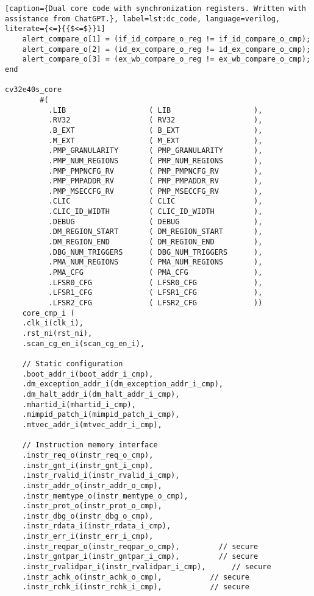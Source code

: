 \begin{lstlisting}[caption={Dual core code with synchronization registers. Written with assistance from ChatGPT.}, label=lst:dc_code, language=verilog, literate={<=}{{$<=$}}1]
    alert_compare_o[1] = (if_id_compare_o_reg != if_id_compare_o_cmp);
    alert_compare_o[2] = (id_ex_compare_o_reg != id_ex_compare_o_cmp);
    alert_compare_o[3] = (ex_wb_compare_o_reg != ex_wb_compare_o_cmp);
end

cv32e40s_core
        #(
          .LIB                   ( LIB                   ),
          .RV32                  ( RV32                  ),
          .B_EXT                 ( B_EXT                 ),
          .M_EXT                 ( M_EXT                 ),
          .PMP_GRANULARITY       ( PMP_GRANULARITY       ),
          .PMP_NUM_REGIONS       ( PMP_NUM_REGIONS       ),
          .PMP_PMPNCFG_RV        ( PMP_PMPNCFG_RV        ),
          .PMP_PMPADDR_RV        ( PMP_PMPADDR_RV        ),
          .PMP_MSECCFG_RV        ( PMP_MSECCFG_RV        ),
          .CLIC                  ( CLIC                  ),
          .CLIC_ID_WIDTH         ( CLIC_ID_WIDTH         ),
          .DEBUG                 ( DEBUG                 ),
          .DM_REGION_START       ( DM_REGION_START       ),
          .DM_REGION_END         ( DM_REGION_END         ),
          .DBG_NUM_TRIGGERS      ( DBG_NUM_TRIGGERS      ),
          .PMA_NUM_REGIONS       ( PMA_NUM_REGIONS       ),
          .PMA_CFG               ( PMA_CFG               ),
          .LFSR0_CFG             ( LFSR0_CFG             ),
          .LFSR1_CFG             ( LFSR1_CFG             ),
          .LFSR2_CFG             ( LFSR2_CFG             ))
    core_cmp_i (
    .clk_i(clk_i),
    .rst_ni(rst_ni),
    .scan_cg_en_i(scan_cg_en_i),

    // Static configuration
    .boot_addr_i(boot_addr_i_cmp),
    .dm_exception_addr_i(dm_exception_addr_i_cmp),
    .dm_halt_addr_i(dm_halt_addr_i_cmp),
    .mhartid_i(mhartid_i_cmp),
    .mimpid_patch_i(mimpid_patch_i_cmp),
    .mtvec_addr_i(mtvec_addr_i_cmp),

    // Instruction memory interface
    .instr_req_o(instr_req_o_cmp),
    .instr_gnt_i(instr_gnt_i_cmp),
    .instr_rvalid_i(instr_rvalid_i_cmp),
    .instr_addr_o(instr_addr_o_cmp),
    .instr_memtype_o(instr_memtype_o_cmp),
    .instr_prot_o(instr_prot_o_cmp),
    .instr_dbg_o(instr_dbg_o_cmp),
    .instr_rdata_i(instr_rdata_i_cmp),
    .instr_err_i(instr_err_i_cmp),
    .instr_reqpar_o(instr_reqpar_o_cmp),         // secure
    .instr_gntpar_i(instr_gntpar_i_cmp),         // secure
    .instr_rvalidpar_i(instr_rvalidpar_i_cmp),      // secure
    .instr_achk_o(instr_achk_o_cmp),           // secure
    .instr_rchk_i(instr_rchk_i_cmp),           // secure


\end{lstlisting}
